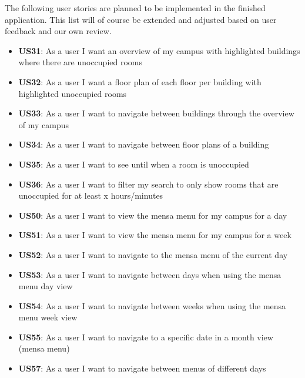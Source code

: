 \begin{markdown}
The following user stories are planned to be implemented in the finished application. This list will of course be extended and adjusted based on user feedback and our own review.

\begin{itemize}
  \item \textbf{US31}: As a user I want an overview of my campus with highlighted buildings where there are unoccupied rooms
  \item \textbf{US32}: As a user I want a floor plan of each floor per building with highlighted unoccupied rooms
  \item \textbf{US33}: As a user I want to navigate between buildings through the overview of my campus
  \item \textbf{US34}: As a user I want to navigate between floor plans of a building
  \item \textbf{US35}: As a user I want to see until when a room is unoccupied
  \item \textbf{US36}: As a user I want to filter my search to only show rooms that are unoccupied for at least x hours/minutes
  \item \textbf{US50}: As a user I want to view the mensa menu for my campus for a day
  \item \textbf{US51}: As a user I want to view the mensa menu for my campus for a week
  \item \textbf{US52}: As a user I want to navigate to the mensa menu of the current day
  \item \textbf{US53}: As a user I want to navigate between days when using the mensa menu day view
  \item \textbf{US54}: As a user I want to navigate between weeks when using the mensa menu week view
  \item \textbf{US55}: As a user I want to navigate to a specific date in a month view (mensa menu)
  \item \textbf{US57}: As a user I want to navigate between menus of different days
\end{itemize} 

\end{markdown}
